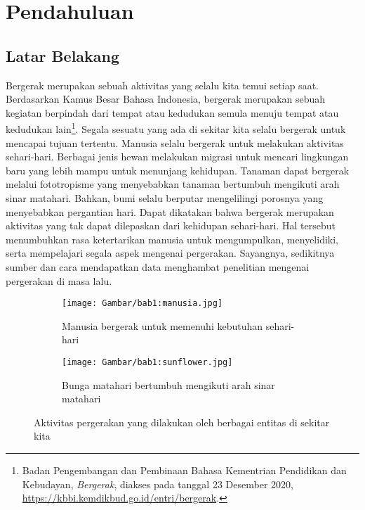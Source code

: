 \chapter{Pendahuluan}
\label{chap:intro}
   
\section{Latar Belakang}
\label{sec:label}

Bergerak merupakan sebuah aktivitas yang selalu kita temui setiap saat. Berdasarkan Kamus Besar Bahasa Indonesia, bergerak merupakan sebuah kegiatan berpindah dari tempat atau kedudukan semula menuju tempat atau kedudukan lain\footnote{Badan Pengembangan dan Pembinaan Bahasa Kementrian Pendidikan dan Kebudayan, \textit{Bergerak}, diakses pada tanggal 23 Desember 2020, \url{https://kbbi.kemdikbud.go.id/entri/bergerak}.}. Segala sesuatu yang ada di sekitar kita selalu bergerak untuk mencapai tujuan tertentu. Manusia selalu bergerak untuk melakukan aktivitas sehari-hari. Berbagai jenis hewan melakukan migrasi untuk mencari lingkungan baru yang lebih mampu untuk menunjang kehidupan. Tanaman dapat bergerak melalui fototropisme yang menyebabkan tanaman bertumbuh mengikuti arah sinar matahari. Bahkan, bumi selalu berputar mengelilingi porosnya yang menyebabkan pergantian hari. Dapat dikatakan bahwa bergerak merupakan aktivitas yang tak dapat dilepaskan dari kehidupan sehari-hari. Hal tersebut menumbuhkan rasa ketertarikan manusia untuk mengumpulkan, menyelidiki, serta mempelajari segala aspek mengenai pergerakan. Sayangnya, sedikitnya sumber dan cara mendapatkan data menghambat penelitian mengenai pergerakan di masa lalu.

\begin{figure}[h]
    \centering
    \begin{subfigure}[b]{0.45\textwidth}
        \texttt{[image: Gambar/bab1:manusia.jpg]}
        \caption{Manusia bergerak untuk memenuhi kebutuhan sehari-hari\protect\footnotemark[2]}
        \label{bab1:manusia}
    \end{subfigure}
    \begin{subfigure}[b]{0.45\textwidth}
        \texttt{[image: Gambar/bab1:sunflower.jpg]}
        \caption{Bunga matahari bertumbuh mengikuti arah sinar matahari\protect\footnotemark[3]}
        \label{bab1:sunflower}
    \end{subfigure}
    \caption[Aktivitas pergerakan]{
    Aktivitas pergerakan yang dilakukan oleh berbagai entitas di sekitar kita}
    \label{bab1:pergerakan}
\end{figure}

